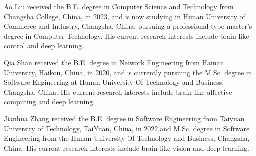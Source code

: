 \documentclass[journal,twoside,web]{ieeecolor}
\begin{document}
\begin{IEEEbiography}{Ao Liu} received the B.E. degree in Computer Science and Technology from Changsha College, China, in 2023, and is now studying in Hunan University of Commerce and Industry, Changsha, China, pursuing a professional type master's degree in Computer Technology. His current research interests include brain-like control and deep learning.
\end{IEEEbiography}

\vfill\null
\newpage
\begin{minipage}[t][0pt][t]{0.48\textwidth}
	\vspace{-10ex}
	\begin{IEEEbiography}{Qia Shan} received the B.E. degree in Network Engineering from Hainan University, Haikou, China, in 2020, and is currently pursuing the M.Sc. degree in Software Engineering at Hunan University Of Technology and Business, Changsha, China. His current research interests include brain-like affective computing and deep learning.
	\end{IEEEbiography}
	
	\begin{IEEEbiography}{Jianhua Zhang} received the B.E. degree in Software Engineering from Taiyuan University of Technology, TaiYuan, China, in 2022,and M.Sc. degree in Software Engineering from the Hunan University Of Technology and Business, Changsha, China. His current research interests include brain-like vision and deep learning.
	\end{IEEEbiography}
    \vspace{\fill} %
\end{minipage}
\end{document}
